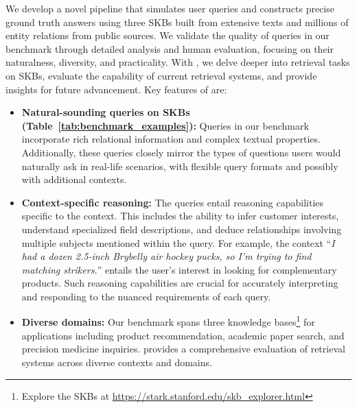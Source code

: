 We develop a novel pipeline that simulates user queries and constructs precise ground truth answers using three SKBs built from extensive texts and millions of entity relations from public sources.
We validate the quality of queries in our benchmark through detailed analysis and human evaluation, focusing on their naturalness, diversity, and practicality.
 With \benchmarkt, we delve deeper into retrieval tasks on SKBs, evaluate the capability of current retrieval systems, and provide insights for future advancement. 
Key features of \benchmarkh are:
\begin{itemize}[leftmargin=*]
    \vspace{-5pt}
    \item \textbf{Natural-sounding queries on SKBs (Table~\ref{tab:benchmark_examples}):} Queries in our benchmark incorporate rich relational information and complex textual properties. Additionally, these queries closely mirror the types of questions users would naturally ask in real-life scenarios, \eg with flexible query formats and possibly with additional contexts.
    \vspace{-1pt}
    \item \textbf{Context-specific reasoning:} The queries entail reasoning capabilities specific to the context. This includes the ability to infer customer interests, understand specialized field descriptions, and deduce relationships involving multiple subjects mentioned within the query.
    For example, the context  ``\textit{I had a dozen 2.5-inch Brybelly air hockey pucks, so I'm trying to find matching strikers.}'' entails the user's interest in looking for complementary products.
    Such reasoning capabilities are crucial for accurately interpreting and responding to the nuanced requirements of each query. 
    \vspace{-1pt}
    \item \textbf{Diverse domains:} 
    Our benchmark spans three knowledge bases\footnote{Explore the SKBs at \textcolor{cyan}{\url{https://stark.stanford.edu/skb_explorer.html}}} for applications including product recommendation, academic paper search, and precision medicine inquiries. \benchmarkh provides a comprehensive evaluation of retrieval systems across diverse contexts and domains. 
\end{itemize}

